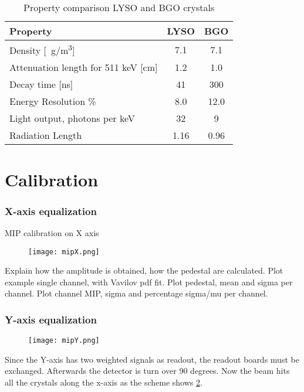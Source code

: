 \begin{table}[ht]\footnotesize
\centering
\begin{tabular*}{0.6\textwidth}{lcc}
Property & LYSO & BGO\\
\hline Density [\SI{}{g/m^3}]& 7.1 & 7.1 \\
Attenuation length for 511 keV [cm] & 1.2 & 1.0\\
Decay time [ns] & 41 & 300\\
Energy Resolution \% & 8.0 & 12.0\\
Light output, photons per keV & 32 &9 \\
Radiation Length							& 1.16 & 0.96\\
\end{tabular*}
\caption{Property comparison LYSO and BGO crystals}\label{property}
\end{table}

\section{Calibration}
\subsubsection{X-axis equalization}
MIP calibration on X axis\\
\begin{figure}[ht]
	\hspace*{\fill}
	\centering
	\texttt{[image: mipX.png]}
	\hspace*{\fill}
	\caption{}\label{mipx}
\end{figure}
Explain how the amplitude is obtained, how the pedestal are calculated.
Plot example single channel, with Vavilov pdf fit.
Plot pedestal, mean and sigma per channel.
Plot channel MIP, sigma and percentage sigma/mu per channel.

\subsubsection{Y-axis equalization}
\begin{figure}[ht]
	\hspace*{\fill}
	\centering
	\texttt{[image: mipY.png]}
	\hspace*{\fill}
	\caption{}\label{mipy}
\end{figure}
Since the Y-axis has two weighted signals as readout, the readout boards must be exchanged. 
Afterwards the detector is turn over 90 degrees. Now the beam hits all the crystals along the x-axis as the scheme shows
\ref{mipy}. \par

